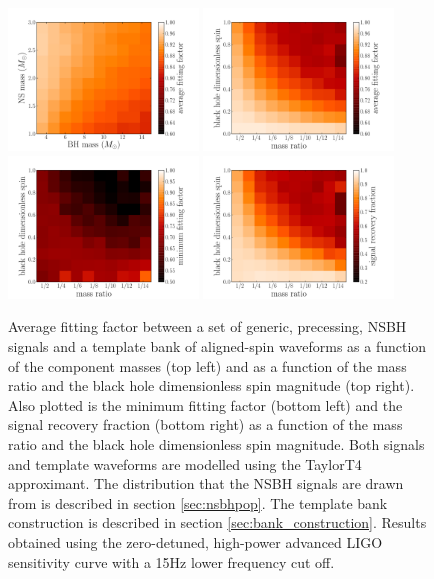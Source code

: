 \begin{figure}
    \centering
    \begin{minipage}[l]{\columnwidth}
    \centering
\includegraphics[width=0.45\textwidth]
{papers/nsbh_effectualness/figure11A.pdf}
\includegraphics[width=0.45\textwidth]
{papers/nsbh_effectualness/figure11B.pdf}
\includegraphics[width=0.45\textwidth]
{papers/nsbh_effectualness/figure11C.pdf}
\includegraphics[width=0.45\textwidth]
{papers/nsbh_effectualness/figure11D.pdf}
\caption{\label{fig:aspinavFF}
Average fitting factor between a set of generic, precessing, NSBH
signals and a template bank of aligned-spin waveforms as a function of the
component masses (top left) and as a function of the
mass ratio and the black hole dimensionless spin
magnitude (top right). Also plotted is the minimum fitting factor (bottom left) 
and the signal recovery fraction (bottom right) as a function of the
mass ratio and the black hole dimensionless spin magnitude. Both signals and
template waveforms are modelled using the TaylorT4 approximant.
The distribution that the NSBH signals are drawn from
is described in section \ref{sec:nsbhpop}. The template bank construction
is described in section \ref{sec:bank_construction}. Results obtained
using the zero-detuned, high-power advanced LIGO sensitivity curve with a 15Hz
lower frequency cut off.
}
\end{minipage}
\end{figure}


